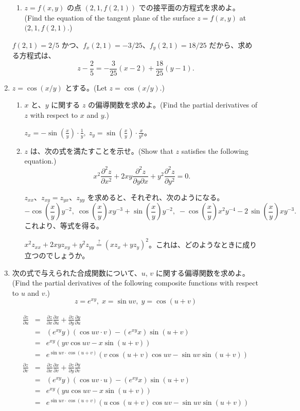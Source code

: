 \begin{enumerate}
\begin{enumerate}
	\item $z = f(x,y)$ の点 $(2,1,f(2,1))$ での接平面の方程式を求めよ。
	(Find the equation of the tangent plane of the surface $z = f(x,y)$ at $(2,1,f(2,1)$.)
	\end{enumerate}
	
	\sol
	$f(2,1) = 2/5$ かつ、$f_x(2,1) = -3/25$、$f_y(2,1) = 18/25$ だから、求める方程式は、
	$$z - \frac25 = -\frac3{25}(x-2) + \frac{18}{25}(y-1).$$

\item $z = \cos(x/y)$ とする。(Let $z = \cos(x/y)$.)
     \begin{enumerate}
     \item $x$ と、$y$ に関する $z$ の偏導関数を求めよ。(Find the partial derivatives of $z$ with respect to $x$ and $y$.)
     
     \sol
     ${\displaystyle z_x = -\sin\left(\frac{x}{y}\right)\cdot \frac{1}{y},\;
     z_y = \sin\left(\frac{x}{y}\right)\cdot \frac{x}{y^2}}$。
     
     \item $z$ は、次の式を満たすことを示せ。(Show that $z$ satisfies the following equation.)
     $$x^2\frac{\partial^2z}{\partial x^2} + 2xy\frac{\partial^2z}{\partial y\partial x} + y^2\frac{\partial^2z}{\partial y^2} = 0.$$
     
     \sol 
     $z_{xx}$、$z_{xy} = z_{yx}$、$z_{yy}$ を求めると、それぞれ、次のようになる。
     $$-\cos({\frac {x}{y}}){y}^{-2},\;\cos({\frac {x}{y}})x{y}^{-3}+\sin({\frac {x}{y}}){y}^{-2},\;-\cos({\frac {x}{y}}){x}^{2}{y}^{-4}-2\,\sin({\frac {x}{y}})x{y}^{-3}.$$
     これより、等式を得る。
     
     \note
     $x^2z_{xx} + 2xyz_{xy} + y^2z_{yy} \stackrel{\mbox{?}}{=} (xz_x + yz_y)^2$。これは、どのようなときに成り立つのでしょうか。
     \end{enumerate}

\item 次の式で与えられた合成関数について、$u$, $v$ に関する偏導関数を求めよ。(Find the partial derivatives of the following composite functions with respect to $u$ and $v$.)
$$z = e^{xy}, \;x = \sin uv, \;y = \cos(u+v)$$

	\sol
	\begin{eqnarray*}
	\frac{\partial z}{\partial u} & = & \frac{\partial z}{\partial x}\frac{\partial x}{\partial u} + \frac{\partial z}{\partial y}\frac{\partial y}{\partial u}\\
	& = & (e^{xy}y)(\cos uv\cdot v) - (e^{xy}x)\sin(u+v)\\
	& = & e^{xy}(yv\cos uv - x\sin(u+v))\\
	& = & e^{\sin uv\cdot \cos(u+v)}(v\cos(u+v)\cos uv - \sin uv\sin(u+v))\\
	\frac{\partial z}{\partial v} & = & \frac{\partial z}{\partial x}\frac{\partial x}{\partial v} + \frac{\partial z}{\partial y}\frac{\partial y}{\partial v}\\
	& = & (e^{xy}y)(\cos uv\cdot u) - (e^{xy}x)\sin(u+v)\\
	& = & e^{xy}(yu\cos uv - x\sin(u+v))\\
	& = & e^{\sin uv\cdot \cos(u+v)}(u\cos(u+v)\cos uv - \sin uv\sin(u+v))
	\end{eqnarray*}
	

\end{enumerate}
